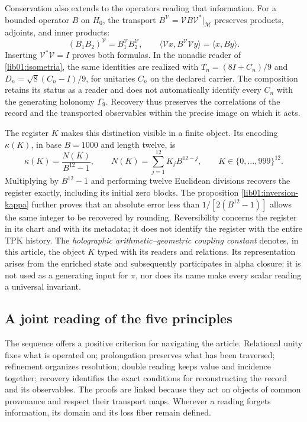 Conservation also extends to the operators reading that information.
For a bounded operator \(B\) on \(H_0\), the transport
\(B^{\mathcal V}=\mathcal VB\mathcal V^*|_{\mathcal M}\) preserves
products, adjoints, and inner products:
\[
 (B_1B_2)^{\mathcal V}=B_1^{\mathcal V}B_2^{\mathcal V},\qquad
 \langle\mathcal Vx,B^{\mathcal V}\mathcal Vy\rangle
                       =\langle x,By\rangle.
\]
Inserting \(\mathcal V^*\mathcal V=I\) proves both formulas. In the
nonadic reader of \cref{lib01:isometria}, the same identities are
realized with \(T_n=(8I+C_n)/9\) and
\(D_n=\sqrt8(C_n-I)/9\), for unitaries \(C_n\) on the declared
carrier. The composition retains its status as a reader and does not
automatically identify every \(C_n\) with the generating holonomy \(\Gamma_9\).
Recovery thus preserves the correlations of the record and the
transported observables within the precise image on which it acts.

The register \(K\) makes this distinction visible in a finite object. Its
encoding \(\kappa(K)\), in base \(B=1000\) and length twelve, is
\[
 \kappa(K)=\frac{N(K)}{B^{12}-1},\qquad
 N(K)=\sum_{j=1}^{12}K_jB^{12-j},\qquad
 K\in\{0,\ldots,999\}^{12}.
\]
Multiplying by \(B^{12}-1\) and performing twelve Euclidean divisions
recovers the register exactly, including its initial zero blocks.
The proposition \cref{lib01:inversion-kappa} further proves that an
absolute error less than \(1/[2(B^{12}-1)]\) allows the same integer to be recovered
by rounding. Reversibility concerns the register in its chart and
with its metadata; it does not identify the register with the entire TPK history. The
\emph{holographic arithmetic--geometric coupling constant} denotes,
in this article, the object \(K\) typed with its readers and relations. Its
representation arises from the enriched state and subsequently participates in
alpha closure: it is not used as a generating input for \(\pi\), nor
does its name make every scalar reading a universal invariant.

\subsection*{A joint reading of the five principles}

The sequence offers a positive criterion for navigating the article. Relational
unity fixes what is operated on; prolongation preserves what has been traversed;
refinement organizes resolution; double reading keeps value
and incidence together; recovery identifies the exact conditions for
reconstructing the record and its observables. The proofs are linked
because they act on objects of common provenance and respect their transport
maps. Wherever a reading forgets information, its domain and its
loss fiber remain defined.

